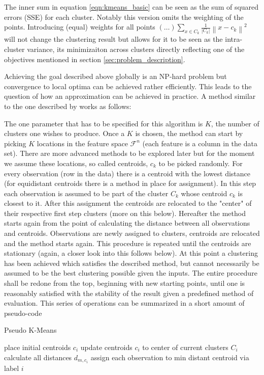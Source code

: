 The inner sum in equation \ref{eqn:kmeans_basic} can be seen as the sum of squared errors (SSE) for each cluster. Notably this version omits the weighting of the points. Introducing (equal) weights for all points $(\dots)\sum_{x \in C_{k}}^{} \frac{1}{\left | C_{k} \right |} \left \| x - c_{k} \right \|^2$ will not change the clustering result but allows for it to be seen as the intra-cluster variance, its minimizaiton across clusters directly reflecting one of the objectives mentioned in section \ref{sec:problem_description}.

Achieving the goal described above globally is an NP-hard problem but convergence to local optima can be achieved rather efficiently. This leads to the question of how an approximation can be achieved in practice. A method similar to the one described by \cite{lloyd1982least,wu2012advances} works as follows:

The one parameter that has to be specified for this algorithm is $K$, the number of clusters one wishes to produce. Once a $K$ is chosen, the method can start by picking $K$ locations in the feature space $\mathcal{F}^{n}$ (each feature is a column in the data set). There are more advanced methods to be explored later but for the moment we assume these locations, so called centroids, $c_{k}$ to be picked randomly.
For every observation (row in the data) there is a centroid with the lowest distance (for equidistant centroids there is a method in place for assignment). In this step each observation is assumed to be part of the cluster $C_{k}$ whose centroid $c_{k}$ is closest to it. After this assignment the centroids are relocated to the "center" of their respective first step clusters (more on this below). Hereafter the method starts again from the point of calculating the distance between all observations and centroids. Observations are newly assigned to clusters, centroids are relocated and the method starts again. This procedure is repeated until the centroids are stationary (again, a closer look into this follows below). At this point a clustering has been achieved which satisfies the described method, but cannot necessarily be assumed to be the best clustering possible given the inputs. The entire procedure shall be redone from the top, beginning with new starting points, until one is reasonably satisfied with the stability of the result given a predefined method of evaluation. This series of operations can be summarized in a short amount of pseudo-code
\begin{algorithm}
\caption{Pseudo K-Means}\label{euclid}
\begin{algorithmic}[1]
\State place initial centroids $c_{i}$ 
\State update centroids $c_{i}$ to center of current clusters $C_{i}$ 
\EndIf
\State calculate all distances $d_{m, c_{i}}$ 
\State assign each observation to min distant centroid via label $i$
\EndWhile
\end{algorithmic}
\end{algorithm}

